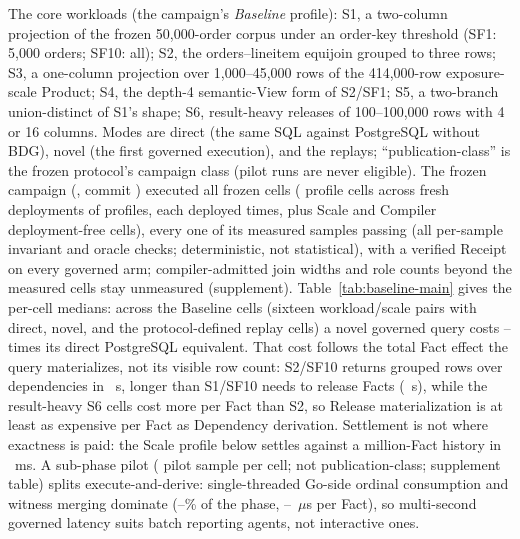 \documentclass[10pt,journal,compsoc]{IEEEtran}
\begin{document}
The core workloads (the campaign's \emph{Baseline} profile): S1, a
two-column projection of the frozen 50,000-order corpus under an order-key
threshold (SF1: 5,000 orders; SF10: all); S2, the orders--lineitem equijoin
grouped to three rows; S3, a one-column projection over 1,000--45,000 rows
of the 414,000-row exposure-scale Product; S4, the depth-4 semantic-View
form of S2/SF1; S5, a two-branch union-distinct of S1's shape; S6,
result-heavy releases of 100--100,000 rows with 4 or 16 columns. Modes
are direct (the same SQL against PostgreSQL without BDG), novel (the first
governed execution), and the replays; ``publication-class'' is the frozen
protocol's campaign class (pilot runs are never eligible). The frozen
campaign (\FinalVFivePublicationCampaign{}, commit
\FinalVFivePublicationCommit{}) executed all
\FinalVFivePublicationTotalCells{} frozen cells
(\FinalVFivePublicationProfileCells{} profile cells across
\FinalVFivePublicationDeployments{} fresh deployments of
\FinalVFivePublicationProfiles{} profiles, each deployed
\FinalVFivePublicationFreshExecutions{} times, plus
\FinalVFivePublicationScaleNonProfileCells{} Scale and
\FinalVFivePublicationCompilerNonProfileCells{} Compiler deployment-free
cells), every one of its \FinalVFivePublicationMeasuredSamples{} measured
samples passing (all per-sample invariant and oracle checks; deterministic,
not statistical), with a verified Receipt on every governed arm;
compiler-admitted join widths and role counts beyond the measured cells
stay unmeasured (supplement).
Table~\ref{tab:baseline-main} gives
the per-cell medians: across the \FinalVFivePublicationBaselineCells{}
Baseline cells (sixteen workload/scale pairs with direct, novel, and the
protocol-defined replay cells) a novel governed query costs
\FinalVFivePublicationOverheadMin{}--\FinalVFivePublicationOverheadMax{}
times its direct PostgreSQL equivalent. That cost follows the total Fact
effect the query materializes, not its visible row count: S2/SF10 returns
\FinalVFivePublicationSTwoRows{} grouped rows over
\FinalVFivePublicationSTwoDependencyFacts{} dependencies in
\FinalVFivePublicationSTwoNovelS{}~s, longer than S1/SF10 needs to release
\FinalVFivePublicationSOneReleaseFacts{} Facts
(\FinalVFivePublicationSOneNovelS{}~s), while the result-heavy S6 cells cost
more per Fact than S2, so Release materialization is at least as expensive
per Fact as Dependency derivation. Settlement is not where exactness is
paid: the Scale profile below settles against a million-Fact history in
\FinalVFivePublicationScaleSettleMillionMS{}~ms. A sub-phase pilot (\FinalVFiveSubphaseSamplesSTwoSFTen{} pilot sample per
cell; not publication-class; supplement table) splits execute-and-derive:
single-threaded Go-side ordinal consumption and witness merging dominate
(\FinalVFiveSubphaseGoSidePctSOneSFOne{}--\FinalVFiveSubphaseGoSidePctSSixHundredKByteSixteen\%
of the phase,
\FinalVFiveSubphaseMicrosPerFactSTwoSFTen{}--\FinalVFiveSubphaseMicrosPerFactSSixHundredKByteSixteen{}~$\mu$s
per Fact), so multi-second governed latency suits batch reporting agents,
not interactive ones.
\end{document}
